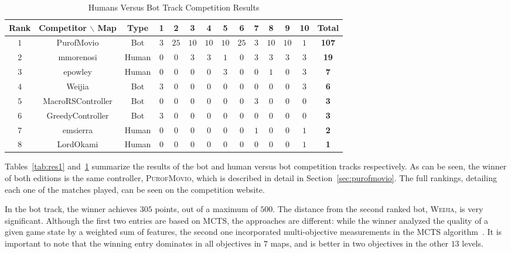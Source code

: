 \documentclass[conference]{IEEEtran}
\begin{document}
\begin{table}[!t]
	\centering
	\begin{tabular}{|c|c|c|c|c|c|c|c|c|c|c|c|c|c|}
		\hline	
\textbf{Rank} & \textbf{Competitor} $\backslash$ \textbf{Map}&\textbf{Type}&\textbf{1}&\textbf{2}&\textbf{3}&\textbf{4}&\textbf{5}&\textbf{6}&\textbf{7}&\textbf{8}&\textbf{9}&\textbf{10}&\textbf{Total}\\
		\hline	
$1$&PurofMovio&Bot&$3$&$25$&$10$&$10$&$10$&$25$&$3$&$10$&$10$&$1$&\textbf{107}\\
		\hline	
$2$&mmorenosi&Human&$0$&$0$&$3$&$3$&$1$&$0$&$3$&$3$&$3$&$3$&\textbf{19}\\
		\hline	
$3$&epowley&Human&$0$&$0$&$0$&$0$&$3$&$0$&$0$&$1$&$0$&$3$&\textbf{7}\\
		\hline	
$4$&Weijia&Bot&$3$&$0$&$0$&$0$&$0$&$0$&$0$&$0$&$0$&$3$&\textbf{6}\\
		\hline	
$5$&MacroRSController&Bot&$0$&$0$&$0$&$0$&$0$&$0$&$3$&$0$&$0$&$0$&\textbf{3}\\
		\hline	
$6$&GreedyController&Bot&$3$&$0$&$0$&$0$&$0$&$0$&$0$&$0$&$0$&$0$&\textbf{3}\\
		\hline	
$7$&emsierra&Human&$0$&$0$&$0$&$0$&$0$&$0$&$1$&$0$&$0$&$1$&\textbf{2}\\
		\hline	
$8$&LordOkami&Human&$0$&$0$&$0$&$0$&$0$&$0$&$0$&$0$&$0$&$1$&\textbf{1}\\
		\hline	
	\end{tabular}
	\caption{Humans Versus Bot Track Competition Results}
	\label{tab:res2}
\end{table}

Tables~\ref{tab:res1} and~\ref{tab:res2} summarize the results of the bot and human versus bot competition tracks respectively. As can be seen, the winner of both editions is the same controller, \textsc{PurofMovio}, which is described in detail in Section~\ref{sec:purofmovio}. The full rankings, detailing each one of the matches played, can be seen on the competition website.

In the bot track, the winner achieves $305$ points, out of a maximum of $500$. The distance from the second ranked bot, \textsc{Weijia}, is very significant. Although the first two entries are based on MCTS, the approaches are different: while the winner analyzed the quality of a given game state by a weighted sum of features, the second one incorporated multi-objective measurements in the MCTS algorithm~\cite{Wang13}. It is important to note that the winning entry dominates in all objectives in $7$ maps, and is better in two objectives in the other $13$ levels.
\end{document}
